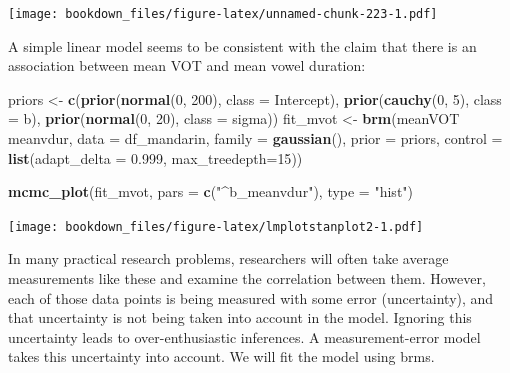 \documentclass[12pt,]{krantz}
\newenvironment{Shaded}{\begin{snugshade}}{\end{snugshade}}
\newcommand{\KeywordTok}[1]{\textcolor[rgb]{0.13,0.29,0.53}{\textbf{#1}}}
\newcommand{\DataTypeTok}[1]{\textcolor[rgb]{0.13,0.29,0.53}{#1}}
\newcommand{\DecValTok}[1]{\textcolor[rgb]{0.00,0.00,0.81}{#1}}
\newcommand{\FloatTok}[1]{\textcolor[rgb]{0.00,0.00,0.81}{#1}}
\newcommand{\StringTok}[1]{\textcolor[rgb]{0.31,0.60,0.02}{#1}}
\newcommand{\OperatorTok}[1]{\textcolor[rgb]{0.81,0.36,0.00}{\textbf{#1}}}
\newcommand{\NormalTok}[1]{#1}
\theoremstyle{definition}
\theoremstyle{definition}
\theoremstyle{definition}
\theoremstyle{remark}
\begin{document}
\texttt{[image: bookdown\_files/figure-latex/unnamed-chunk-223-1.pdf]}

A simple linear model seems to be consistent with the claim that there
is an association between mean VOT and mean vowel duration:

\begin{Shaded}
\begin{Highlighting}[]
\NormalTok{priors <-}\StringTok{ }\KeywordTok{c}\NormalTok{(}\KeywordTok{prior}\NormalTok{(}\KeywordTok{normal}\NormalTok{(}\DecValTok{0}\NormalTok{, }\DecValTok{200}\NormalTok{), }\DataTypeTok{class =}\NormalTok{ Intercept),}
            \KeywordTok{prior}\NormalTok{(}\KeywordTok{cauchy}\NormalTok{(}\DecValTok{0}\NormalTok{, }\DecValTok{5}\NormalTok{), }\DataTypeTok{class =}\NormalTok{ b),}
            \KeywordTok{prior}\NormalTok{(}\KeywordTok{normal}\NormalTok{(}\DecValTok{0}\NormalTok{, }\DecValTok{20}\NormalTok{), }\DataTypeTok{class =}\NormalTok{ sigma))}
\NormalTok{fit_mvot <-}\StringTok{ }\KeywordTok{brm}\NormalTok{(meanVOT }\OperatorTok{~}\StringTok{ }\NormalTok{meanvdur,}
                \DataTypeTok{data =}\NormalTok{ df_mandarin, }
                \DataTypeTok{family =} \KeywordTok{gaussian}\NormalTok{(), }
                \DataTypeTok{prior =}\NormalTok{ priors,}
                \DataTypeTok{control =} \KeywordTok{list}\NormalTok{(}\DataTypeTok{adapt_delta =} \FloatTok{0.999}\NormalTok{,}
                               \DataTypeTok{max_treedepth=}\DecValTok{15}\NormalTok{))}
\end{Highlighting}
\end{Shaded}

\begin{Shaded}
\begin{Highlighting}[]
\KeywordTok{mcmc_plot}\NormalTok{(fit_mvot, }\DataTypeTok{pars =} \KeywordTok{c}\NormalTok{(}\StringTok{"^b_meanvdur"}\NormalTok{), }\DataTypeTok{type =} \StringTok{"hist"}\NormalTok{)}
\end{Highlighting}
\end{Shaded}

\texttt{[image: bookdown\_files/figure-latex/lmplotstanplot2-1.pdf]}

In many practical research problems, researchers will often take average
measurements like these and examine the correlation between them.
However, each of those data points is being measured with some error
(uncertainty), and that uncertainty is not being taken into account in
the model. Ignoring this uncertainty leads to over-enthusiastic
inferences. A measurement-error model takes this uncertainty into
account. We will fit the model using brms.
\end{document}

